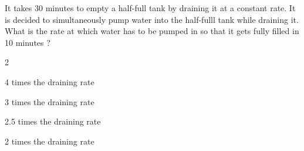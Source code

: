 	\item It takes 30 minutes to empty a half-full tank by draining it at a constant rate. It is decided to simultaneously pump water into the half-fulll tank while draining it. What is the rate at which water has to be pumped in so that it gets fully filled in 10 minutes ?
		\begin{enumerate}
		\end{enumerate}

